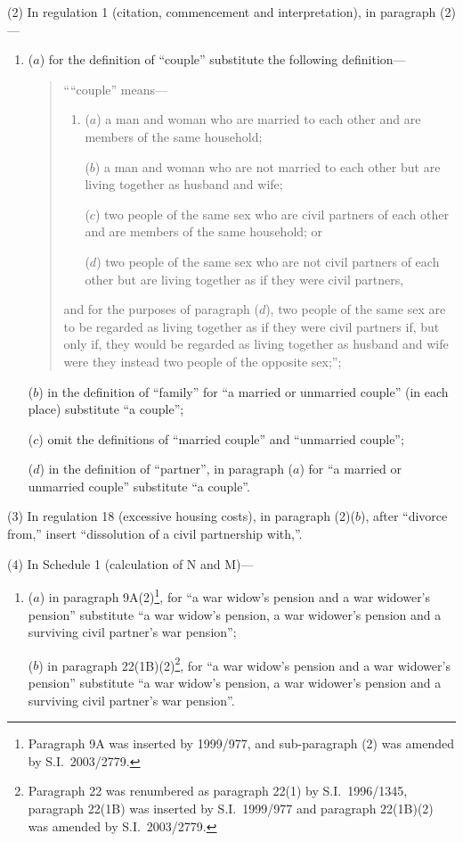\documentclass[12pt,a4paper]{article}
\begin{document}
(2) In regulation 1 (citation, commencement and interpretation), in paragraph (2)—
\begin{enumerate}\item[]
($a$) for the definition of “couple” substitute the following definition—
\begin{quotation}
““couple” means—
\begin{enumerate}\item[]
($a$) 
a man and woman who are married to each other and are members of the same household;

($b$) 
a man and woman who are not married to each other but are living together as husband and wife;

($c$) 
two people of the same sex who are civil partners of each other and are members of the same household; or

($d$) 
two people of the same sex who are not civil partners of each other but are living together as if they were civil partners,
\end{enumerate}
and for the purposes of paragraph ($d$), two people of the same sex are to be regarded as living together as if they were civil partners if, but only if, they would be regarded as living together as husband and wife were they instead two people of the opposite sex;”;\end{quotation}

($b$) in the definition of “family” for “a married or unmarried couple” (in each place) substitute “a couple”;

($c$) omit the definitions of “married couple” and “unmarried couple”;

($d$) in the definition of “partner”, in paragraph ($a$)  for “a married or unmarried couple” substitute “a couple”.
\end{enumerate}

(3) In regulation 18 (excessive housing costs), in paragraph (2)($b$), after “divorce from,” insert “dissolution of a civil partnership with,”.

(4) In Schedule 1 (calculation of N and M)—
\begin{enumerate}\item[]
($a$) in paragraph 9A(2)\footnote{Paragraph 9A was inserted by 1999/977, and sub-paragraph (2) was amended by S.I.\ 2003/2779.}, for “a war widow’s pension and a war widower’s pension” substitute “a war widow’s pension, a war widower’s pension and a surviving civil partner’s war pension”;

($b$) in paragraph 22(1B)(2)\footnote{Paragraph 22 was renumbered as paragraph 22(1) by S.I.\ 1996/1345, paragraph 22(1B) was inserted by S.I.\ 1999/977 and paragraph 22(1B)(2) was amended by S.I.\ 2003/2779.}, for “a war widow’s pension and a war widower’s pension” substitute “a war widow’s pension, a war widower’s pension and a surviving civil partner’s war pension”.
\end{enumerate}
\end{document}
